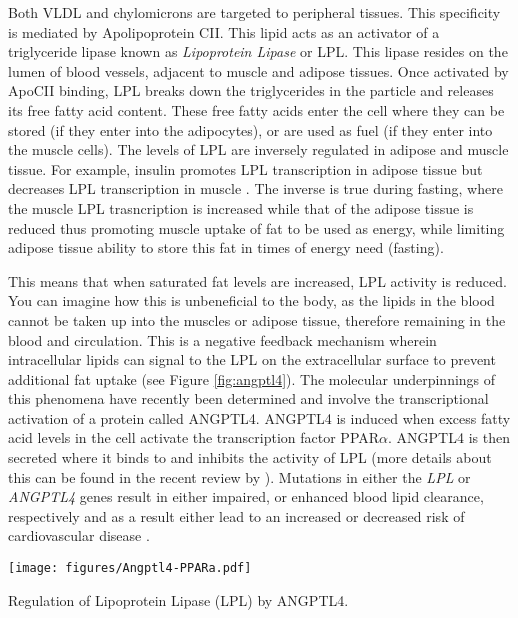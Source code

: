 \documentclass{tufte-handout}
\begin{document}
Both VLDL and chylomicrons are targeted to peripheral tissues.  This specificity is mediated by Apolipoprotein CII.  This lipid acts as an activator of a triglyceride lipase known as \emph{Lipoprotein Lipase} or LPL.  This lipase resides on the lumen of blood vessels, adjacent to muscle and adipose tissues.  Once activated by ApoCII binding, LPL breaks down the triglycerides in the particle and releases its free fatty acid content.  These free fatty acids enter the cell where they can be stored (if they enter into the adipocytes), or are used as fuel (if they enter into the muscle cells).  The levels of LPL are inversely regulated in adipose and muscle tissue. For example, insulin promotes LPL transcription in adipose tissue but decreases LPL transcription in muscle \citep{Spooners1979}.  The inverse is true during fasting, where the muscle LPL trasncription is increased while that of the adipose tissue is reduced thus promoting muscle uptake of fat to be used as energy, while limiting adipose tissue ability to store this fat in times of energy need (fasting). 

  This means that when saturated fat levels are increased, LPL activity is reduced. You can imagine how this is unbeneficial to the body, as the lipids in the blood cannot be taken up into the muscles or adipose tissue, therefore remaining in the blood and circulation.  This is a negative feedback mechanism wherein intracellular lipids can signal to the LPL on the extracellular surface to prevent additional fat uptake (see Figure \ref{fig:angptl4}).  The molecular underpinnings of this phenomena have recently been determined and involve the transcriptional activation of a protein called ANGPTL4.  ANGPTL4 is induced when excess fatty acid levels in the cell activate the transcription factor PPAR$\alpha$.  ANGPTL4 is then secreted where it binds to and inhibits the activity of LPL (more details about this can be found in the recent review by \citet{Dijk2014}).  Mutations in either the \textit{LPL} or \textit{ANGPTL4} genes result in either impaired, or enhanced blood lipid clearance, respectively and as a result either lead to an increased or decreased risk of cardiovascular disease \citep{Article2016b}.

\begin{marginfigure}
\texttt{[image: figures/Angptl4-PPARa.pdf]}
\caption{Regulation of Lipoprotein Lipase (LPL) by ANGPTL4.}
\label{fig:angptl4}
\end{marginfigure}
\end{document}
